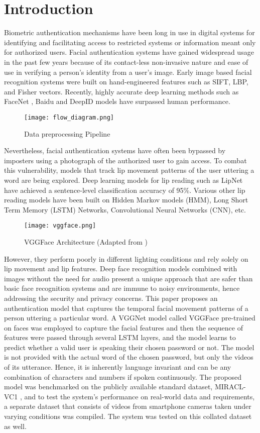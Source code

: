\documentclass[letterpaper]{article}
\begin{document}
\section{Introduction}
 Biometric authentication mechanisms have been long in use in digital systems for identifying and facilitating access to restricted systems or information meant only for authorized users. Facial authentication systems have gained widespread usage in the past few years because of its contact-less non-invasive nature and ease of use in verifying a person's identity from a user's image. Early image based facial recognition systems were built on hand-engineered features such as SIFT, LBP, and Fisher vectors. Recently, highly accurate deep learning methods such as FaceNet \cite{facenet}, Baidu \cite{baidu} and DeepID models \cite{deepnet,deepId2,deepid3} have surpassed human performance. 
\begin{figure}[h!]
    \centering
    \texttt{[image: flow\_diagram.png]}
    \caption{Data preprocessing Pipeline} 
    \label{fig:fig2}
\end{figure}
Nevertheless, facial authentication systems have often been bypassed by imposters using a photograph of the authorized user to gain access. To combat this vulnerability, models that track lip movement patterns of the user uttering a word are being explored. Deep learning models for lip reading such as LipNet \cite{DBLP:journals/corr/abs-1807-05162} have achieved a sentence-level classification accuracy of 95\%. Various other lip reading models have been built on Hidden Markov models (HMM), Long Short Term Memory (LSTM) Networks, Convolutional Neural Networks (CNN), etc. 
\begin{figure*}[ht]
    \centering
    \texttt{[image: vggface.png]}
    \caption{VGGFace Architecture (Adapted from \cite{vggface})}
    \label{fig:VGG}
\end{figure*}
However, they perform poorly in different lighting conditions and rely solely on lip movement and lip features. Deep face recognition models combined with images without the need for audio present a unique approach that are safer than basic face recognition systems and are immune to noisy environments, hence addressing the security and privacy concerns. This paper proposes an authentication model that captures the temporal facial movement patterns of a person uttering a particular word. A VGGNet model \cite{vggnet} called VGGFace \cite{vggface} pre-trained on faces was employed to capture the facial features and then the sequence of features were passed through several LSTM layers, and the model learns to predict whether a valid user is speaking their chosen password or not. The model is not provided with the actual word of the chosen password, but only the videos of its utterance. Hence, it is inherently language invariant and can be any combination of characters and numbers if spoken continuously. The proposed model was benchmarked on the publicly available standard dataset, MIRACL-VC1 \cite{dataset}, and to test the system's performance on real-world data and requirements, a separate dataset that consists of videos from smartphone cameras taken under varying conditions was compiled. The system was tested on this collated dataset as well. 
\end{document}
